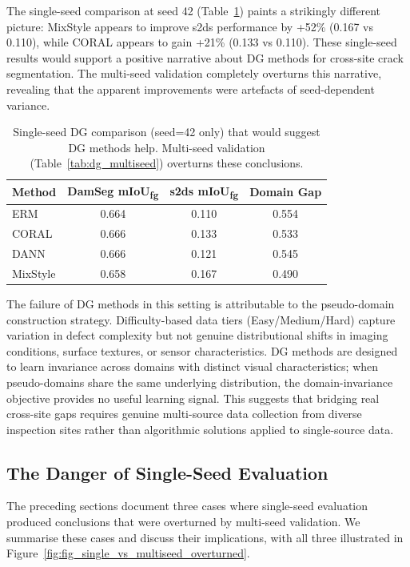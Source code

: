\documentclass[preprint,12pt]{elsarticle}
\begin{document}
The single-seed comparison at seed 42 (Table~\ref{tab:dg_singleseed}) paints a strikingly different picture: MixStyle appears to improve s2ds performance by +52\% (0.167 vs 0.110), while CORAL appears to gain +21\% (0.133 vs 0.110). These single-seed results would support a positive narrative about DG methods for cross-site crack segmentation. The multi-seed validation completely overturns this narrative, revealing that the apparent improvements were artefacts of seed-dependent variance.

\begin{table}[t]
\centering
\caption{Single-seed DG comparison (seed=42 only) that would suggest DG methods help. Multi-seed validation (Table~\ref{tab:dg_multiseed}) overturns these conclusions.}
\label{tab:dg_singleseed}
\begin{tabular}{lccc}
\toprule
Method & DamSeg mIoU\textsubscript{fg} & s2ds mIoU\textsubscript{fg} & Domain Gap \\
\midrule
ERM & 0.664 & 0.110 & 0.554 \\
CORAL & 0.666 & 0.133 & 0.533 \\
DANN & 0.666 & 0.121 & 0.545 \\
MixStyle & 0.658 & 0.167 & 0.490 \\
\bottomrule
\end{tabular}
\end{table}

The failure of DG methods in this setting is attributable to the pseudo-domain construction strategy. Difficulty-based data tiers (Easy/Medium/Hard) capture variation in defect complexity but not genuine distributional shifts in imaging conditions, surface textures, or sensor characteristics. DG methods are designed to learn invariance across domains with distinct visual characteristics; when pseudo-domains share the same underlying distribution, the domain-invariance objective provides no useful learning signal. This suggests that bridging real cross-site gaps requires genuine multi-source data collection from diverse inspection sites rather than algorithmic solutions applied to single-source data.


\subsection{The Danger of Single-Seed Evaluation}
\label{sec:results_singleseed}

The preceding sections document three cases where single-seed evaluation produced conclusions that were overturned by multi-seed validation. We summarise these cases and discuss their implications, with all three illustrated in Figure~\ref{fig:fig_single_vs_multiseed_overturned}.
\end{document}
